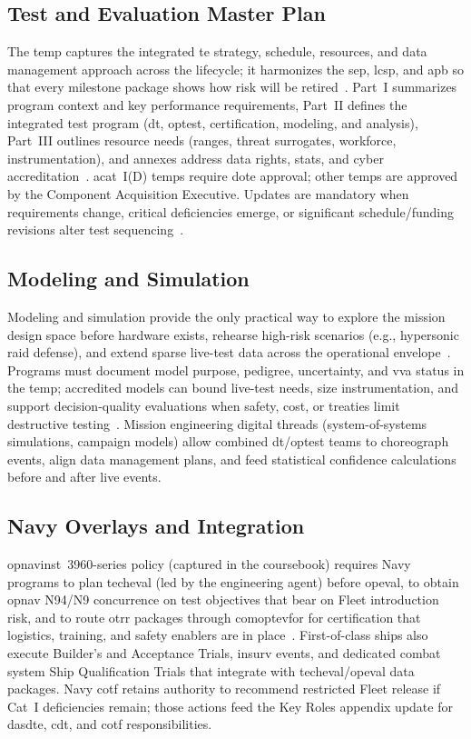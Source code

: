 \documentclass[../main.tex]{subfiles}
\begin{document}
\subsection{Test and Evaluation Master Plan}
The \ac{temp} captures the integrated \ac{te} strategy, schedule, resources, and data management approach across the lifecycle; it harmonizes the \ac{sep}, \ac{lcsp}, and \ac{apb} so that every milestone package shows how risk will be retired~\autocite{DoDAcqGuidebook}. Part~I summarizes program context and key performance requirements, Part~II defines the integrated test program (\ac{dt}, \ac{optest}, certification, modeling, and analysis), Part~III outlines resource needs (ranges, threat surrogates, workforce, instrumentation), and annexes address data rights, stats, and cyber accreditation~\autocite{DoDI5000-89}. \ac{acat}~I(D) \acp{temp} require \ac{dote} approval; other \acp{temp} are approved by the Component Acquisition Executive. Updates are mandatory when requirements change, critical deficiencies emerge, or significant schedule/funding revisions alter test sequencing~\autocite{DoDI5000-85}.

\subsection{Modeling and Simulation}
Modeling and simulation provide the only practical way to explore the mission design space before hardware exists, rehearse high-risk scenarios (e.g., hypersonic raid defense), and extend sparse live-test data across the operational envelope~\autocite{edo-3-5-5-test-eval-part-i-2025}. Programs must document model purpose, pedigree, uncertainty, and \ac{vva} status in the \ac{temp}; accredited models can bound live-test needs, size instrumentation, and support decision-quality evaluations when safety, cost, or treaties limit destructive testing~\autocite{DoDI5000-89}. Mission engineering digital threads (system-of-systems simulations, campaign models) allow combined \ac{dt}/\ac{optest} teams to choreograph events, align data management plans, and feed statistical confidence calculations before and after live events.

\subsection{Navy Overlays and Integration}
\ac{opnavinst}~3960-series policy (captured in the coursebook) requires Navy programs to plan \ac{techeval} (led by the engineering agent) before \ac{opeval}, to obtain \ac{opnav} N94/N9 concurrence on test objectives that bear on Fleet introduction risk, and to route \ac{otrr} packages through \ac{comoptevfor} for certification that logistics, training, and safety enablers are in place~\autocite{edo-3-5-6-test-eval-part-ii-2025}. First-of-class ships also execute Builder's and Acceptance Trials, \ac{insurv} events, and dedicated combat system Ship Qualification Trials that integrate with \ac{techeval}/\ac{opeval} data packages. Navy \ac{cotf} retains authority to recommend restricted Fleet release if Cat~I deficiencies remain; those actions feed the Key Roles appendix update for \ac{dasdte}, \ac{cdt}, and \ac{cotf} responsibilities.
\end{document}
